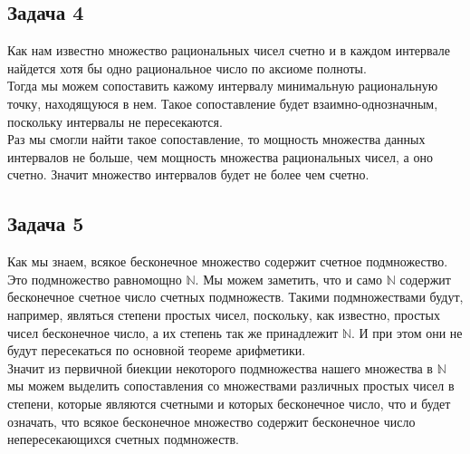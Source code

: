 	\subsection{Задача 4}
	Как нам известно множество рациональных чисел счетно и в каждом интервале найдется хотя бы одно рациональное число по аксиоме полноты. \\
	Тогда мы можем сопоставить кажому интервалу минимальную рациональную точку, находящуюся в нем. Такое сопоставление будет взаимно-однозначным, поскольку интервалы не пересекаются. \\
	Раз мы смогли найти такое сопоставление, то мощность множества данных интервалов не больше, чем мощность множества рациональных чисел, а оно счетно. Значит множество интервалов будет не более чем счетно.
	
	\subsection{Задача 5}
	Как мы знаем, всякое бесконечное множество содержит счетное подмножество. \\
	Это подмножество равномощно $\mathbb{N}$. Мы можем заметить, что и само $\mathbb{N}$ содержит бесконечное счетное число счетных подмножеств. Такими подмножествами будут, например, являться степени простых чисел, поскольку, как известно, простых чисел бесконечное число, а их степень так же принадлежит $\mathbb{N}$. И при этом они не будут пересекаться по основной теореме арифметики.\\
	Значит из первичной биекции некоторого подмножества нашего множества в $\mathbb{N}$ мы можем выделить сопоставления со множествами различных простых чисел в степени, которые являются счетными и которых бесконечное число, что и будет означать, что всякое бесконечное множество содержит бесконечное число непересекающихся счетных подмножеств.

	
